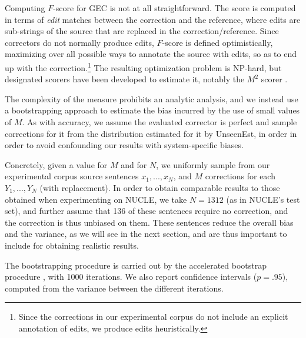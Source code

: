 \documentclass[letter,11pt]{article}
\begin{document}
		Computing $F$-score for GEC is not at all straightforward. The score is computed
		in terms of {\it edit} matches between the correction and the reference, where edits are sub-strings of the source
		that are replaced in the correction/reference.
                Since correctors
		do not normally produce edits, $F$-score is defined optimistically, maximizing
		over all possible ways to annotate the source with edits,
                so as to end up with the correction.\footnote{Since the corrections in our experimental
                  corpus do not include an explicit annotation of edits, we produce edits heuristically.}
		The resulting optimization problem is NP-hard, but designated scorers
		have been developed to estimate it, notably the $M^2$ scorer 
		\cite{dahlmeier2012better}.
		
		The complexity of the measure prohibits an analytic analysis, and
                we instead use a bootstrapping approach to estimate the bias
		incurred by the use of small values of $M$.
		As with accuracy, we assume the evaluated corrector is perfect and sample corrections for it
                from the distribution estimated for it by {\sc UnseenEst}, in order
                in order to avoid confounding our results with system-specific biases.
                
		Concretely, given a value for $M$ and for $N$, we uniformly sample from our experimental
                corpus source sentences $x_1,...,x_N$, and $M$ corrections for each $Y_1,...,Y_N$ (with replacement).
                In order to obtain comparable results to those obtained when experimenting on NUCLE,
                we take $N=1312$ (as in NUCLE's test set), and further assume that 136 of these sentences
                require no correction, and the correction is thus unbiased on them. These sentences
                reduce the overall bias and the variance, as we will see in the next section, and are thus
                important to include for obtaining realistic results.

                The bootstrapping procedure is carried out by the
                accelerated bootstrap procedure \cite{efron1987better}, with 1000 iterations.
                We also report confidence intervals ($p=.95$), computed from the variance
                between the different iterations.
                                
\end{document}
